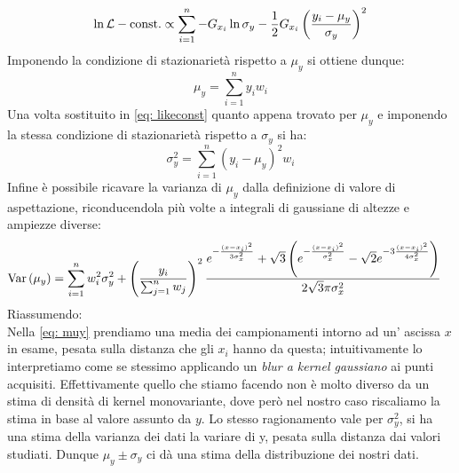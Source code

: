\documentclass{article}[a4paper, oneside, 11pt]
\begin{document}
\begin{equation}\label{eq: likeconst}
	\ln{\mathcal L} - \text{const.} \propto \sum_{i=1}^{n} -G_{x_i} \ln{\sigma_y}
	- \frac{1}{2} G_{x_i} \left( \frac{y_i - \mu_y}{\sigma_y} \right)^2
\end{equation}
Imponendo la condizione di stazionarietà rispetto a $\mu_y$ si ottiene dunque:
\begin{equation}\label{eq: muy}
	\mu_y = \sum_{i=1}^{n} y_i w_i 
\end{equation} 
Una volta sostituito in \eqref{eq: likeconst} quanto appena trovato per $\mu_y$
e imponendo la stessa condizione di stazionarietà rispetto a $\sigma_y$ si ha:
\begin{equation}\label{eq: sigmay}
	\sigma_y^2 = \sum_{i=1}^{n} (y_i - \mu_y)^2 w_i
\end{equation}
Infine è possibile ricavare la varianza di $\mu_y$ dalla definizione di valore
di aspettazione, riconducendola più volte a integrali di gaussiane di altezze
e ampiezze diverse:
\begin{align} \label{aln: varmuy}
	\text{Var}\left(\mu_y\right) &= \sum_{i=1}^{n} w_i^2 \sigma_y^2 + 
	\left(\frac{y_i}{\sum_{j=1}^{n} w_j} \right)^2 \frac{
	e^{-\frac{(x-x_i)^2}{3 \sigma_x^2}} +  
	\sqrt{3} \left( e^{-\frac{(x-x_i)^2}{\sigma_x^2}} -
	\sqrt{2} e^{-3 \frac{(x-x_i)^2}{4 \sigma_x^2}} \right)
	} {2 \sqrt{3}\pi \sigma_x^2} 
\end{align}
Riassumendo:\\
Nella \eqref{eq: muy} prendiamo una media dei campionamenti intorno ad un'
ascissa $x$ in esame, pesata sulla distanza che gli $x_i$ hanno da questa; 
intuitivamente lo interpretiamo come se stessimo applicando un 
\emph{blur a kernel gaussiano} ai punti acquisiti.
Effettivamente quello che stiamo facendo non è molto diverso da un stima
di densità di kernel monovariante, dove però nel nostro caso
riscaliamo la stima in base al valore assunto da $y$.
Lo stesso ragionamento vale per $\sigma_y^2$, si ha una stima della varianza
dei dati la variare di y, pesata sulla distanza dai valori studiati. Dunque
$\mu_y \pm \sigma_y$ ci dà una stima della distribuzione dei nostri dati.
\end{document}
